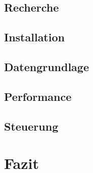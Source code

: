 \documentclass{article}
\begin{document}
        \subsection{Recherche}
        \subsection{Installation}
        \subsection{Datengrundlage}
        \subsection{Performance}


        \subsection{Steuerung}
    \section{Fazit}
\end{document}
